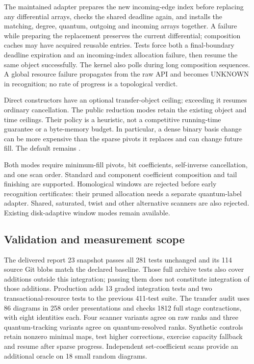 The maintained adapter prepares the new incoming-edge index before replacing
any differential arrays, checks the shared deadline again, and installs the
matching, degree, quantum, outgoing and incoming arrays together.  A failure
while preparing the replacement preserves the current differential; composition
caches may have acquired reusable entries.  Tests force both a final-boundary
deadline expiration and an incoming-index allocation failure, then resume the
same object successfully.  The kernel also polls during long composition
sequences.  A global resource failure propagates from the raw API and becomes
UNKNOWN in recognition; no rate of progress is a topological verdict.

Direct constructors have an optional transfer-object ceiling; exceeding it
resumes ordinary cancellation.  The public reduction modes retain the existing
object and time ceilings.  Their policy is a heuristic, not a competitive
running-time guarantee or a byte-memory budget.  In particular, a dense binary
basis change can be more expensive than the sparse pivots it replaces and can
change future fill.  The default remains .

Both modes require minimum-fill pivots, bit coefficients, self-inverse
cancellation, and one scan order.  Standard and component coefficient
composition and tail finishing are supported.  Homological windows are
rejected before early recognition certificates: their pruned allocation needs
a separate quantum-label adapter.  Shared, saturated, twist and other
alternative scanners are also rejected.  Existing disk-adaptive window modes
remain available.

\subsection{Validation and measurement scope}
The delivered report 23 snapshot passes all 281 tests unchanged and its
114 source Git blobs match the declared baseline.  Those full archive tests
also cover additions outside this integration; passing them does not constitute
integration of those additions.  Production adds 13 graded integration tests
and two transactional-resource tests to the previous 411-test suite.
The transfer audit uses 86 diagrams in 258 order presentations and checks
1812 full stage contractions, with eight identities each.  Four scanner
variants agree on raw ranks and three quantum-tracking variants agree on
quantum-resolved ranks.  Synthetic controls retain nonzero minimal maps,
test higher corrections, exercise capacity fallback and resume after sparse
progress.  Independent set-coefficient scans provide an additional oracle
on 18 small random diagrams.

